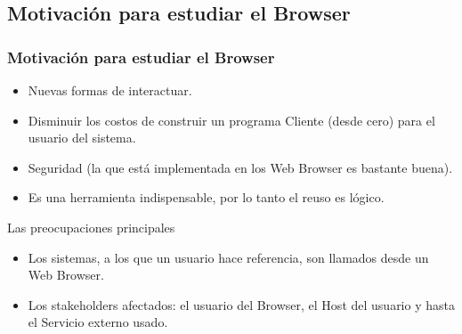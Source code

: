 \documentclass[serif,9pt]{beamer}
\begin{document}

\subsection{Motivaci\'on para estudiar el Browser}
\begin{frame}
	\frametitle{Motivaci\'on para estudiar el Browser}
	\begin{itemize}
		\item Nuevas formas de interactuar.
		\item Disminuir los costos de construir un programa Cliente (desde cero) para
el usuario del sistema.
		\item Seguridad (la que est\'a implementada en los Web Browser es bastante buena).
		\item Es una herramienta indispensable, por lo tanto el reuso es lógico.
	\end{itemize}
	
	\begin{block}{Las preocupaciones principales}
	\begin{itemize}
		\item Los sistemas, a los que un usuario hace referencia, son llamados desde un Web Browser.
		\item Los stakeholders afectados: el usuario del Browser, el Host del usuario y hasta el Servicio externo usado.
	\end{itemize}
	\end{block}
\end{frame}
\end{document}
